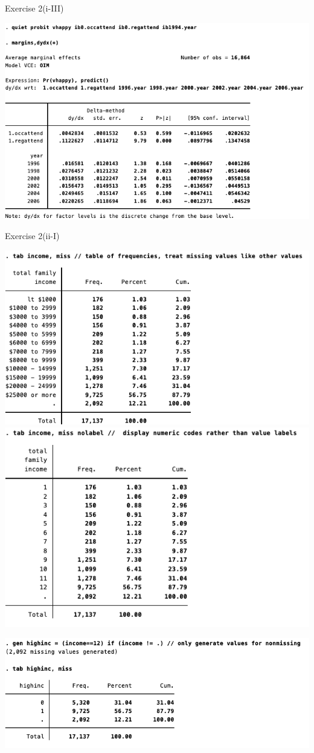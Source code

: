 \documentclass[
  10pt,
  ignorenonframetext,
]{beamer}
\begin{document}
\begin{frame}{Exercise 2(i-III)}
\protect\hypertarget{ex2-PROBIT-APE}{}
\begin{center}\includegraphics[width=0.9\linewidth]{pictures/ex2-PROBIT-APE} \end{center}
\end{frame}

\begin{frame}{Exercise 2(ii-I)}
\protect\hypertarget{highinc}{}
\begin{center}\includegraphics[width=0.46\linewidth]{pictures/ex2-income-tab} \includegraphics[width=0.46\linewidth]{pictures/ex2-income-tabnolab} \end{center}

\begin{center}\includegraphics[width=0.8\linewidth]{pictures/ex2-incomenew} \end{center}
\end{frame}
\end{document}
